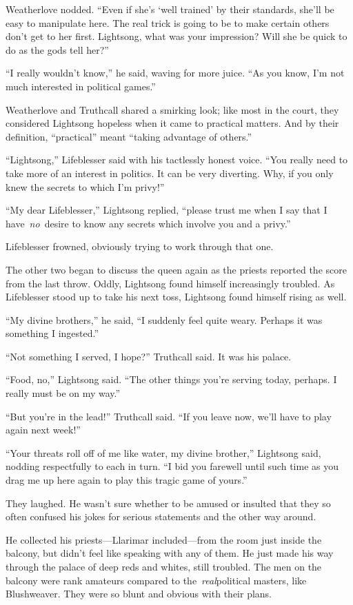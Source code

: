 Weatherlove nodded. “Even if she’s ‘well trained’ by their standards, she’ll be easy to manipulate here. The real trick is going to be to make certain others don’t get to her first. Lightsong, what was your impression? Will she be quick to do as the gods tell her?”

“I really wouldn’t know,” he said, waving for more juice. “As you know, I’m not much interested in political games.”

Weatherlove and Truthcall shared a smirking look; like most in the court, they considered Lightsong hopeless when it came to practical matters. And by their definition, “practical” meant “taking advantage of others.”

“Lightsong,” Lifeblesser said with his tactlessly honest voice. “You really need to take more of an interest in politics. It can be very diverting. Why, if you only knew the secrets to which I’m privy!”

“My dear Lifeblesser,” Lightsong replied, “please trust me when I say that I have~\textit{no}~desire to know any secrets which involve you and a privy.”

Lifeblesser frowned, obviously trying to work through that one.

The other two began to discuss the queen again as the priests reported the score from the last throw. Oddly, Lightsong found himself increasingly troubled. As Lifeblesser stood up to take his next toss, Lightsong found himself rising as well.

“My divine brothers,” he said, “I suddenly feel quite weary. Perhaps it was something I ingested.”

“Not something I served, I hope?” Truthcall said. It was his palace.

“Food, no,” Lightsong said. “The other things you’re serving today, perhaps. I really must be on my way.”

“But you’re in the lead!” Truthcall said. “If you leave now, we’ll have to play again next week!”

“Your threats roll off of me like water, my divine brother,” Lightsong said, nodding respectfully to each in turn. “I bid you farewell until such time as you drag me up here again to play this tragic game of yours.”

They laughed. He wasn’t sure whether to be amused or insulted that they so often confused his jokes for serious statements and the other way around.

He collected his priests—Llarimar included—from the room just inside the balcony, but didn’t feel like speaking with any of them. He just made his way through the palace of deep reds and whites, still troubled. The men on the balcony were rank amateurs compared to the~\textit{real}political masters, like Blushweaver. They were so blunt and obvious with their plans.

